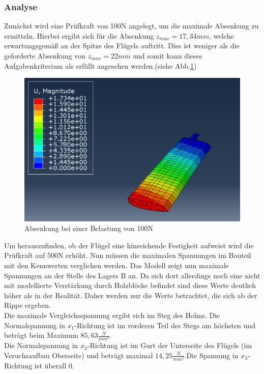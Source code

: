 \subsubsection{Analyse}
Zunächst wird eine Prüfkraft von 100N angelegt, um die maximale Absenkung zu ermitteln. Hierbei ergibt sich für die Absenkung $z_{max}=17,34mm$, welche erwartungsgemäß an der Spitze des Flügels auftritt. Dies ist weniger als die geforderte Absenkung von $z_{max}=22mm$ und somit kann dieses Aufgabenkriterium als erfüllt angesehen werden.(siehe Abb.\ref{Absenkung})
\begin{figure}[h]
 \centering
 \includegraphics[scale=0.4]{Bilder/Absenkung_100N}
 \caption{Absenkung bei einer Belastung von 100N}
 \label{Absenkung}
\end{figure}
\newpage
\noindent
Um herauszufinden, ob der Flügel eine hinreichende Festigkeit aufweist wird die Prüfkraft auf 500N erhöht. Nun müssen die maximalen Spannungen im Bauteil mit den Kennwerten verglichen werden. Das Modell zeigt nun maximale Spannungen an der Stelle des Lagers B an. Da sich dort allerdings noch eine nicht mit modellierte Verstärkung durch Holzblöcke befindet sind diese Werte deutlich höher als in der Realität. Daher werden nur die Werte betrachtet, die sich ab der Rippe ergeben.\\
Die maximale Vergleichsspannung ergibt sich im Steg des Holms. Die Normalspannung in $x_{1}$-Richtung ist im vorderen Teil des Stegs am höchsten und beträgt beim Maximum $85,63\frac{N}{mm^2}$.\\
Die Normalspannung in $x_{2}$-Richtung ist im Gurt der Unterseite des Flügels (im Veruchsaufbau Oberseite) und beträgt maximal $14,25\frac{N}{mm^2}$.Die Spannung in $x_{3}$-Richtung ist überall 0.\\
